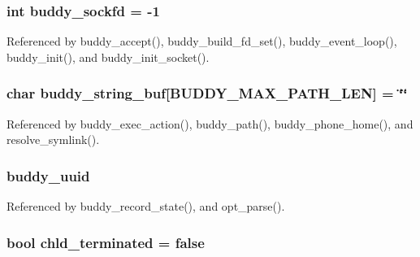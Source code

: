 \subsubsection[{buddy\_\-sockfd}]{\setlength{\rightskip}{0pt plus 5cm}int {\bf buddy\_\-sockfd} = -\/1\hspace{0.3cm}{\ttfamily  [static]}}\label{buddy_8c_ab8ae7575757371a277bb048389ca9f84}


Referenced by buddy\_\-accept(), buddy\_\-build\_\-fd\_\-set(), buddy\_\-event\_\-loop(), buddy\_\-init(), and buddy\_\-init\_\-socket().

\subsubsection[{buddy\_\-string\_\-buf}]{\setlength{\rightskip}{0pt plus 5cm}char {\bf buddy\_\-string\_\-buf}[BUDDY\_\-MAX\_\-PATH\_\-LEN] = \char`\"{}\char`\"{}\hspace{0.3cm}{\ttfamily  [static]}}\label{buddy_8c_a12b4e74d3f481815831cbeb5cde0d996}


Referenced by buddy\_\-exec\_\-action(), buddy\_\-path(), buddy\_\-phone\_\-home(), and resolve\_\-symlink().

\subsubsection[{buddy\_\-uuid}]{ {\bf buddy\_\-uuid}}\label{buddy_8c_a3e9321d881ca257289c65b5022b693c8}


Referenced by buddy\_\-record\_\-state(), and opt\_\-parse().

\subsubsection[{chld\_\-terminated}]{\setlength{\rightskip}{0pt plus 5cm}bool {\bf chld\_\-terminated} = false\hspace{0.3cm}{\ttfamily  [static]}}\label{buddy_8c_ac7d1b197ce100f66f7fd13dc10b94154}


